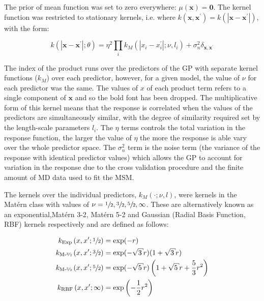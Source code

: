 The prior of mean function  was set to zero everywhere: $\mu(\mathbf{x})=\mathbf{0}$. The kernel function was restricted to stationary kernels, i.e. where $k(\mathbf{x}, \mathbf{x}^{\prime}) = k(|\mathbf{x} - \mathbf{x}^{\prime}|)$, with the form: 

\begin{equation}\label{eqn:kernel_form}
    k(|\mathbf{x}-\mathbf{x}^{\prime}|; \theta) = 
    \eta^{2}\prod_i k_{M}(|x_{i}-x_{i}^{\prime}|; \nu, l_i)
    +\sigma_{n}^{2}\delta_{\mathbf{x}, \mathbf{x}^{\prime}}
\end{equation}

The index of the product runs over the predictors of the GP with separate kernel functions ($k_{M}$) over each predictor, however, for a given model, the value of $\nu$ for each predictor was the same. The values of $x$ of each product term refers to a single component of $\mathbf{x}$ and so the bold font has been dropped. The multiplicative form of this kernel means that the response is correlated when the values of the predictors are simultaneously similar, with the degree of similarity required set by the length-scale parameters $l_{i}$.  The $\eta$ terms controls the total variation in the response function, the larger the value of $\eta$ the more the response is able vary over the whole predictor space. The $\sigma_{n}^{2}$ term is the noise term (the variance of the response with identical predictor values) which allows the GP to account for variation in the response due to the cross validation procedure and the finite amount of MD data used to fit the MSM. 

The kernels over the individual predictors, $k_{M}(\cdot; \nu, l)$, were kernels in the Mat\'{e}rn class with values of $\nu=\sfrac{1}{2},\sfrac{3}{2},\sfrac{5}{2},\infty$. These are alternatively known as an exponential,Mat\'{e}rn 3-2, Mat\'{e}rn 5-2 and  Gaussian (Radial Basis Function, RBF) kernels respectively and are defined as follows: 

\begin{align}
k_{\text{Exp}}\left(x, x^{\prime}; \sfrac{1}{2}\right) &=\exp (-r) \label{eqn:kern_exp}\\
k_{\text{M-\sfrac{3}{2}}}\left(x, x^{\prime}; \sfrac{3}{2}\right) &= \exp (-\sqrt{3} r)(1+\sqrt{3} r) \label{eqn:kern_m32} \\
k_{\text{M-\sfrac{5}{2}}}\left(x, x^{\prime}; \sfrac{5}{2}\right) &= \exp (-\sqrt{5} r)\left(1+\sqrt{5} r+\frac{5}{3} r^{2}\right) \label{eqn:kern_m52}\\
k_{\text{RBF}}\left(x, x^{\prime}; \infty\right) &= \exp \left(-\frac{1}{2} r^{2}\right) \label{eqn:kern_gauss}
\end{align}

